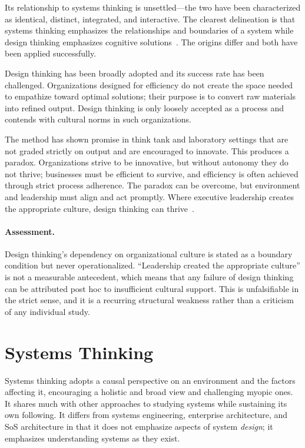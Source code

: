 \documentclass[11pt,a4paper]{article}
\begin{document}
Its relationship to systems thinking is unsettled---the two have been
characterized as identical, distinct, integrated, and interactive. The clearest
delineation is that systems thinking emphasizes the relationships and boundaries
of a system while design thinking emphasizes cognitive
solutions~\citep{greene2017}. The origins differ and both have been applied
successfully.

Design thinking has been broadly adopted and its success rate has been
challenged. Organizations designed for efficiency do not create the space needed
to empathize toward optimal solutions; their purpose is to convert raw materials
into refined output. Design thinking is only loosely accepted as a process and
contends with cultural norms in such organizations.

The method has shown promise in think tank and laboratory settings that are not
graded strictly on output and are encouraged to innovate. This produces a
paradox. Organizations strive to be innovative, but without autonomy they do not
thrive; businesses must be efficient to survive, and efficiency is often
achieved through strict process adherence. The paradox can be overcome, but
environment and leadership must align and act promptly. Where executive
leadership creates the appropriate culture, design thinking can
thrive~\citep{dunne2018}.

\paragraph{Assessment.} Design thinking's dependency on organizational culture
is stated as a boundary condition but never operationalized. ``Leadership
created the appropriate culture'' is not a measurable antecedent, which means
that any failure of design thinking can be attributed post hoc to insufficient
cultural support. This is unfalsifiable in the strict sense, and it is a
recurring structural weakness rather than a criticism of any individual study.

\section{Systems Thinking}
\label{sec:st}

Systems thinking adopts a causal perspective on an environment and the factors
affecting it, encouraging a holistic and broad view and challenging myopic ones.
It shares much with other approaches to studying systems while sustaining its
own following. It differs from systems engineering, enterprise architecture, and
SoS architecture in that it does not emphasize aspects of system \emph{design};
it emphasizes understanding systems as they exist.
\end{document}

